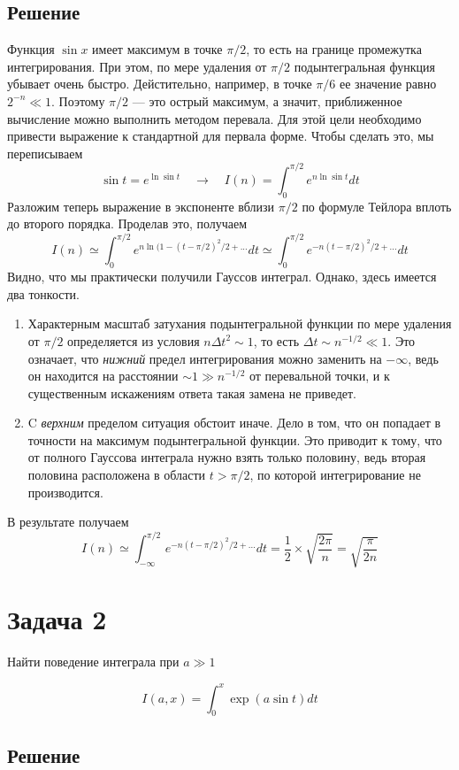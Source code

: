 \documentclass[a4paper,12pt]{article}
\begin{document}
\subsection{Решение}
Функция $\sin x$ имеет максимум в точке $\pi/2$, то есть на границе промежутка интегрирования. При этом, по мере удаления от $\pi /2$ подынтегральная функция убывает очень быстро. Дейстительно, например, в точке $\pi/6$ ее значение равно $2^{-n}\ll 1$. Поэтому $\pi/2$ --- это острый максимум, а значит, приближенное вычисление можно выполнить методом перевала. Для этой цели необходимо привести выражение к стандартной для первала форме. Чтобы сделать это, мы переписываем
\[
\sin t = e^{\ln \sin t}\quad \rightarrow \quad I(n)=\int_0^{\pi/2}e^{n\ln \sin t}dt 
\]
\noindent
Разложим теперь выражение в экспоненте вблизи $\pi/2$ по формуле Тейлора вплоть до второго порядка. Проделав это, получаем
\[
I(n)\simeq \int_0^{\pi/2}e^{n\ln (1-(t-\pi/2)^2/2+...}dt \simeq \int_0^{\pi/2}e^{-n(t-\pi/2)^2/2+...}dt
\]
\noindent
Видно, что мы практически получили Гауссов интеграл. Однако, здесь имеется два тонкости.
\begin{enumerate}
\item Характерным масштаб затухания подынтегральной функции по мере удаления от $\pi/2$ определяется из условия $n\Delta t^2\sim 1$,  то есть $\Delta t \sim n^{-1/2}\ll 1$. Это означает, что \textit{нижний} предел интегрирования можно заменить на $-\infty$, ведь он находится на расстоянии $\sim 1 \gg n^{-1/2}$ от перевальной точки, и к существенным искажениям ответа такая замена не приведет.
\item C \textit{верхним} пределом ситуация обстоит иначе. Дело в том, что он попадает в точности на максимум подынтегральной функции. Это  приводит к тому, что от полного Гауссова интеграла нужно взять только половину, ведь вторая половина расположена в области $t>\pi/2$, по которой интегрирование не производится.
\end{enumerate}
\noindent
В результате получаем
\[
I(n)\simeq \int_{-\infty}^{\pi/2}e^{-n(t-\pi/2)^2/2+...}dt=\frac{1}{2}\times \sqrt{\frac{2\pi}{n}} = \sqrt{\frac{\pi}{2n}}
\]

\section{Задача 2}

Найти поведение интеграла при $a \gg 1$

\[
I(a,x)=\int_{0}^{x}\exp(a\sin t)dt
\]


\subsection{Решение}
\end{document}
